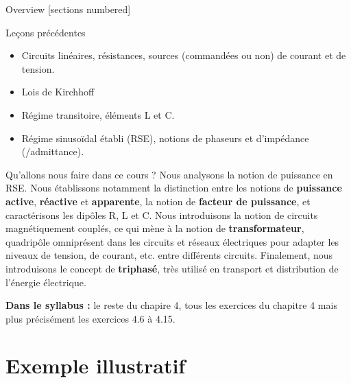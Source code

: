 \titleframe

\begin{frame}{Overview}
  [sections numbered]
  \tableofcontents[hideallsubsections]
\end{frame}


\begin{frame} {Leçons précédentes}
\begin{itemize}
	\item Circuits linéaires, résistances, sources (commandées ou non) de courant et de tension.
	\item Lois de Kirchhoff
	\item Régime transitoire, éléments L et C.
	\item Régime sinusoïdal établi (RSE), notions de phaseurs et d'impédance (/admittance).
\end{itemize}
\vfill
\end{frame}

\begin{frame}{Qu'allons nous faire dans ce cours ?}
Nous analysons la notion de puissance en RSE. Nous établissons notamment la distinction entre les notions de \textbf{puissance active}, \textbf{réactive} et \textbf{apparente}, la notion de \textbf{facteur de puissance}, et caractérisons les dipôles R, L et C.
\vfill 
Nous introduisons la notion de circuits magnétiquement couplés, ce qui mène à la notion de \textbf{transformateur}, quadripôle omniprésent dans les circuits et réseaux électriques pour adapter les niveaux de tension, de courant, etc. entre différents circuits.
\vfill 	
Finalement, nous introduisons le concept de \textbf{triphasé}, très utilisé en transport et distribution de l'énergie électrique.
\vfill 

\textbf{Dans le syllabus :} le reste du chapire 4, tous les exercices du chapitre 4 mais plus précisément les exercices 4.6 à 4.15.

\end{frame}


\section{Exemple illustratif}

